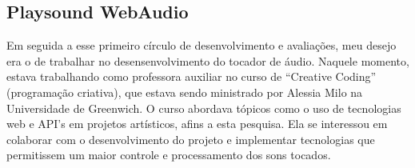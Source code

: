 






\subsection{Playsound WebAudio}

Em seguida a esse primeiro círculo de desenvolvimento e avaliações, meu desejo era o de trabalhar no desensenvolvimento do tocador de áudio. Naquele momento, estava trabalhando como professora auxiliar no curso de ``Creative Coding'' (programação criativa), que estava sendo ministrado por Alessia Milo na Universidade de Greenwich. O curso abordava tópicos como o uso de tecnologias web e API's em projetos artísticos, afins a
 esta pesquisa. Ela se interessou em colaborar com o desenvolvimento do projeto e implementar tecnologias que permitissem um maior controle e processamento dos sons tocados.

